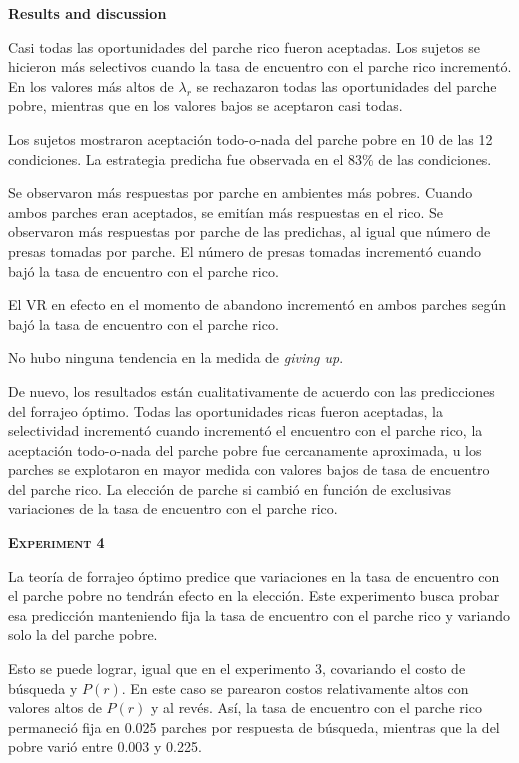 \documentclass[a4paper,12pt]{article}
\begin{document}
{\bfseries Results and discussion}

Casi todas las oportunidades del parche rico fueron aceptadas. Los sujetos se hicieron más selectivos cuando la tasa de encuentro con el parche rico incrementó. En los valores más altos de $\lambda_{r}$ se rechazaron todas las oportunidades del parche pobre, mientras que en los valores bajos se aceptaron casi todas. 

Los sujetos mostraron aceptación todo-o-nada del parche pobre en 10 de las 12 condiciones. La estrategia predicha fue observada en el 83\% de las condiciones.

Se observaron más respuestas por parche en ambientes más pobres. Cuando ambos parches eran aceptados, se emitían más respuestas en el rico. Se observaron más respuestas por parche de las predichas, al igual que número de presas tomadas por parche. El número de presas tomadas incrementó cuando bajó la tasa de encuentro con el parche rico.

El VR en efecto en el momento de abandono incrementó en ambos parches según bajó la tasa de encuentro con el parche rico.

No hubo ninguna tendencia en la medida de {\itshape giving up}.

De nuevo, los resultados están cualitativamente de acuerdo con las predicciones del forrajeo óptimo. Todas las oportunidades ricas fueron aceptadas, la selectividad incrementó cuando incrementó el encuentro con el parche rico, la aceptación todo-o-nada del parche pobre fue cercanamente aproximada, u los parches se explotaron en mayor medida con valores bajos de tasa de encuentro del parche rico. La elección de parche si cambió en función de exclusivas variaciones de la tasa de encuentro con el parche rico.

{\scshape\bfseries Experiment 4}

La teoría de forrajeo óptimo predice que variaciones en la tasa de encuentro con el parche pobre no tendrán efecto en la elección. Este experimento busca probar esa predicción manteniendo fija la tasa de encuentro con el parche rico y variando solo la del parche pobre.

Esto se puede lograr, igual que en el experimento 3, covariando el costo de búsqueda y $P(r)$. En este caso se parearon costos relativamente altos con valores altos de $P(r)$ y al revés. Así, la tasa de encuentro con el parche rico permaneció fija en 0.025 parches por respuesta de búsqueda, mientras que la del pobre varió entre 0.003 y 0.225.
\end{document}
